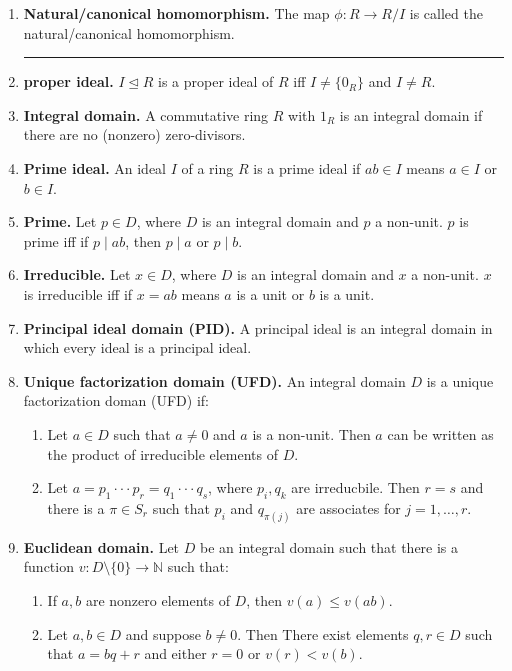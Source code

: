 \begin{enumerate}
	\item \textbf{Natural/canonical homomorphism. } The map $\phi: R \to R/I$ is called the natural/canonical homomorphism. 
	\begin{center}
		\hrule
	\end{center}
	\item \textbf{proper ideal. } $I \unlhd R$ is a proper ideal of $R$ iff $I \neq \{0_R\}$ and $I \neq R$. 
	\item \textbf{Integral domain. } A commutative ring $R$ with $1_R$ is an integral domain if there are no (nonzero) zero-divisors. 
	\item \textbf{Prime ideal. } An ideal $I$ of a ring $R$ is a prime ideal if $ab \in I$ means $a \in I$ or $b \in I$. 
	\item \textbf{Prime. } Let $p \in D$, where $D$ is an integral domain and $p$ a non-unit. $p$ is prime iff if $p \mid ab$, then $p \mid a$ or $p \mid b$. 
	\item \textbf{Irreducible. } Let $x \in D$, where $D$ is an integral domain and $x$ a non-unit. $x$ is irreducible iff if $x =ab$ means $a$ is a unit or $b$ is a unit. 
	\item \textbf{Principal ideal domain (PID). } A principal ideal is an integral domain in which every ideal is a principal ideal. 
	\item \textbf{Unique factorization domain (UFD). } An integral domain $D$ is a unique factorization doman (UFD) if: 
	\begin{enumerate}
		\item Let $a \in D$ such that $a \neq 0$ and $a$ is a non-unit. Then $a$ can be written as the product of irreducible elements of $D$. 
		\item Let $a = p_1 \cdot \cdot \cdot p_r = q_1 \cdot \cdot \cdot q_s$, where $p_i,q_k$ are irreducbile. Then $r=s$ and there is a $\pi \in S_r$ such that $p_i$ and $q_{\pi(j)}$ are associates for $j=1,\dots,r$. 
	\end{enumerate}
	\item \textbf{Euclidean domain. } Let $D$ be an integral domain such that there is a function $v: D \setminus \{0\} \to \mathbb{N}$ such that: 
	\begin{enumerate}
		\item If $a,b$ are nonzero elements of $D$, then $v(a) \leq v(ab)$. 
		\item Let $a,b \in D$ and suppose $b \neq 0$. Then There exist elements $q,r \in D$ such that $a=bq+r$ and either $r=0$ or $v(r) < v(b)$. 
	\end{enumerate}

\end{enumerate}
